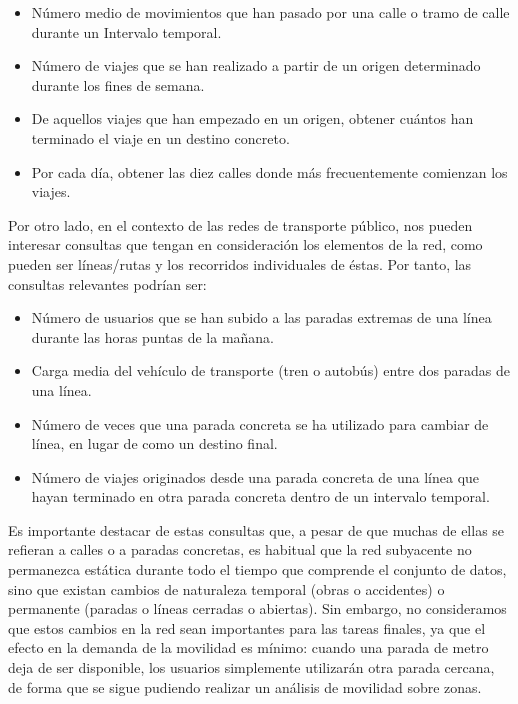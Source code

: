     \begin{itemize}
        \item N\'umero medio de movimientos que han pasado por una calle o tramo de calle durante un Intervalo temporal.
        \item N\'umero de viajes que se han realizado a partir de un origen determinado durante los fines de semana.
        \item De aquellos viajes que han empezado en un origen, obtener cu\'antos han terminado el viaje en un destino concreto.
        \item Por cada d\'ia, obtener las diez calles donde m\'as frecuentemente comienzan los viajes.
    \end{itemize}
    
    Por otro lado, en el contexto de las redes de transporte p\'ublico, nos pueden interesar consultas que tengan en consideraci\'on los elementos de la red, como pueden ser l\'ineas/rutas y los recorridos individuales de \'estas. Por tanto, las consultas relevantes podr\'ian ser:
    
    \begin{itemize}
        \item N\'umero de usuarios que se han subido a las paradas extremas de una l\'inea durante las horas puntas de la ma\~nana.
        \item Carga media del veh\'iculo de transporte (tren o autob\'us) entre dos paradas de una l\'inea.
        \item N\'umero de veces que una parada concreta se ha utilizado para cambiar de l\'inea, en lugar de como un destino final.
        \item N\'umero de viajes originados desde una parada concreta de una l\'inea que hayan terminado en otra parada concreta dentro de un intervalo temporal.
    \end{itemize}
    
    Es importante destacar de estas consultas que, a pesar de que muchas de ellas se refieran a calles o a paradas concretas, es habitual que la red subyacente no permanezca est\'atica durante todo el tiempo que comprende el conjunto de datos, sino que existan cambios de naturaleza temporal (obras o accidentes) o permanente (paradas o l\'ineas cerradas o abiertas).  Sin embargo, no consideramos que estos cambios en la red sean importantes para las tareas finales, ya que el efecto en la demanda de la movilidad es m\'inimo: cuando una parada de metro deja de ser disponible, los usuarios simplemente utilizar\'an otra parada cercana, de forma que se sigue pudiendo realizar un an\'alisis de movilidad sobre zonas.
    
